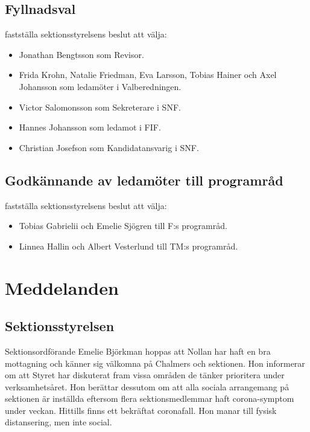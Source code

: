 \documentclass[hidelinks]{../sektionsmote} %
\begin{document}
\subsection{Fyllnadsval}
\begin{beslut}
    \item fastställa sektionsstyrelsens beslut att välja:
    \begin{itemize}
        \item Jonathan Bengtsson som Revisor.
        \item Frida Krohn, Natalie Friedman, Eva Larsson, Tobias Hainer och Axel Johansson som ledamöter i Valberedningen.
        \item Victor Salomonsson som Sekreterare i SNF.
        \item Hannes Johansson som ledamot i FIF.
        \item Christian Josefson som Kandidatansvarig i SNF.
    \end{itemize}
\end{beslut}

\subsection{Godkännande av ledamöter till programråd}
\begin{beslut}
    \item fastställa sektionsstyrelsens beslut att välja:
    \begin{itemize}
        \item Tobias Gabrielii och Emelie Sjögren till F:s programråd.
        \item Linnea Hallin och Albert Vesterlund till TM:s programråd.
    \end{itemize}
\end{beslut}


\section{Meddelanden}

\subsection{Sektionsstyrelsen}
Sektionsordförande Emelie Björkman hoppas att Nollan har haft en bra mottagning och känner sig välkomna på Chalmers och sektionen.
Hon informerar om att Styret har diskuterat fram vissa områden de tänker prioritera under verksamhetsåret.
Hon berättar dessutom om att alla sociala arrangemang på sektionen är inställda eftersom flera sektionsmedlemmar haft corona-symptom under veckan.
Hittills finns ett bekräftat coronafall.
Hon manar till fysisk distansering, men inte social.
\end{document}
